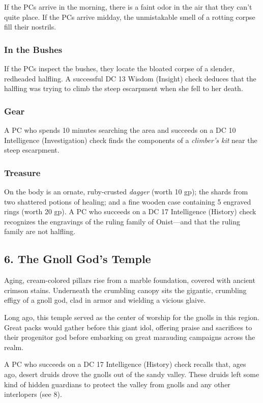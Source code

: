 \documentclass[10pt,a4paper,twoside,bg=print,twocolumn,openany,nodeprecatedcode]{dndbook}
\begin{document}
If the PCs arrive in the morning, there is a faint odor in the air that they can't quite place. If the PCs arrive midday, the unmistakable smell of a rotting corpse fill their nostrils.

\subsubsection{In the Bushes}
If the PCs inspect the bushes, they locate the bloated corpse of a slender, redheaded halfling. A successful DC 13 Wisdom (Insight) check deduces that the halfling was trying to climb the steep escarpment when she fell to her death.

\subsubsection{Gear}
A PC who spends 10 minutes searching the area and succeeds on a DC 10 Intelligence (Investigation) check finds the components of a \textit{climber's kit} near the steep escarpment.

\subsubsection{Treasure}
On the body is an ornate, ruby-crusted \textit{dagger} (worth 10 gp); the shards from two shattered potions of healing; and a fine wooden case containing 5 engraved rings (worth 20 gp). A PC who succeeds on a DC 17 Intelligence (History) check recognizes the engravings of the ruling family of Onist—and that the ruling family are not halfling.

\subsection{6. The Gnoll God's Temple}
\begin{DndReadAloud}{}
Aging, cream-colored pillars rise from a marble foundation, covered with ancient crimson stains. Underneath the crumbling canopy sits the gigantic, crumbling effigy of a gnoll god, clad in armor and wielding a vicious glaive.

\end{DndReadAloud}

Long ago, this temple served as the center of worship for the gnolls in this region. Great packs would gather before this giant idol, offering praise and sacrifices to their progenitor god before embarking on great marauding campaigns across the realm.

A PC who succeeds on a DC 17 Intelligence (History) check recalls that, ages ago, desert druids drove the gnolls out of the sandy valley. These druids left some kind of hidden guardians to protect the valley from gnolls and any other interlopers (see 8).
\end{document}
